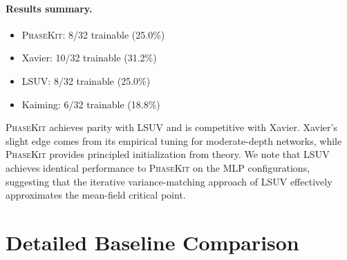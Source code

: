 \documentclass[10pt]{article}
\newcommand{\ToolName}{\textsc{PhaseKit}}
\begin{document}
\paragraph{Results summary.}
\begin{itemize}[nosep]
    \item \ToolName{}: 8/32 trainable (25.0\%)
    \item Xavier: 10/32 trainable (31.2\%)
    \item LSUV: 8/32 trainable (25.0\%)
    \item Kaiming: 6/32 trainable (18.8\%)
\end{itemize}

\ToolName{} achieves parity with LSUV and is competitive with Xavier.
Xavier's slight edge comes from its empirical tuning for moderate-depth networks, while \ToolName{} provides principled initialization from theory.
We note that LSUV achieves identical performance to \ToolName{} on the MLP configurations, suggesting that the iterative variance-matching approach of LSUV effectively approximates the mean-field critical point.

\section{Detailed Baseline Comparison}
\label{app:baseline-detail}
\end{document}
